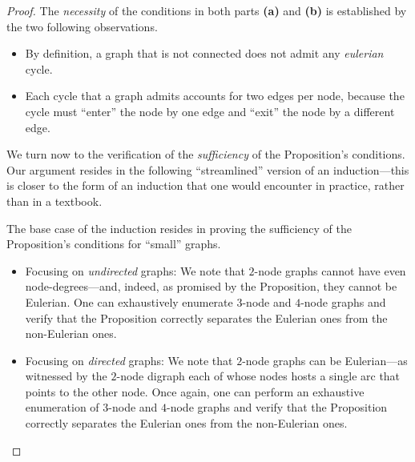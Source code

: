 \begin{proof}
The {\em necessity} of the conditions in both parts {\bf (a)} and {\bf
  (b)} is established by the two following observations.
\begin{itemize}
\item
By definition, a graph that is not connected does not admit any \textit{eulerian} cycle.
\item
Each cycle that a graph admits accounts for two edges per node,
because the cycle must ``enter'' the node by one edge and ``exit'' the
node by a different edge.
\end{itemize}

\smallskip

\noindent
We turn now to the verification of the {\em sufficiency} of the
Proposition's conditions.  Our argument resides in the following
``streamlined'' version of an induction---this is closer to the form
of an induction that one would encounter in practice, rather than in a
textbook.

The base case of the induction resides in proving the sufficiency of
the Proposition's conditions for ``small'' graphs.  
\bigskip

\noindent {}


\begin{itemize}
\item
Focusing on {\em undirected} graphs: We note that $2$-node graphs
cannot have even node-degrees---and, indeed, as promised by the
Proposition, they cannot be Eulerian.  One can exhaustively enumerate
$3$-node and $4$-node graphs and verify that the Proposition correctly
separates the Eulerian ones from the non-Eulerian ones.
\item
Focusing on {\em directed} graphs: We note that $2$-node graphs can be
Eulerian---as witnessed by the $2$-node digraph each of whose nodes
hosts a single arc that points to the other node.  Once again, one can
perform an exhaustive enumeration of $3$-node and $4$-node graphs
and verify that the Proposition correctly separates the Eulerian ones
from the non-Eulerian ones.
\end{itemize}


\end{proof}
